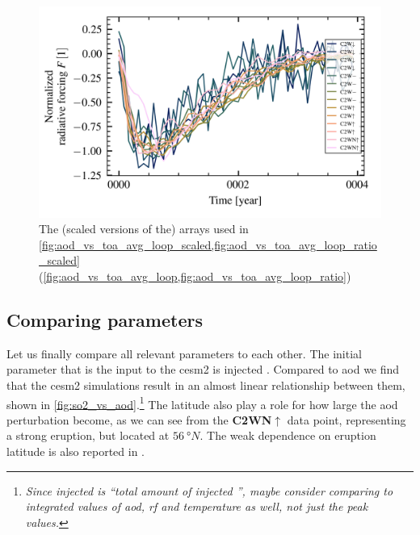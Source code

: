 \documentclass[twocol]{ametsocV5}
\newcommand{\iso}[1][i]{{#1}njected \ce{SO2}}
\begin{document}
\begin{figure}[t]
  \begin{center}
    \includegraphics[width=0.95\linewidth]{figures/toa_arrays_normalized.png}
  \end{center}
  \caption{
    The (scaled versions of the) arrays used in
    \cref{fig:aod_vs_toa_avg_loop_scaled,fig:aod_vs_toa_avg_loop_ratio_scaled}
    (\cref{fig:aod_vs_toa_avg_loop,fig:aod_vs_toa_avg_loop_ratio})
  }%
  \label{fig:toa_arrays_normalized}
\end{figure}

\subsection{Comparing parameters}

Let us finally compare all relevant parameters to each other. The initial parameter that
is the input to the \acrshort{cesm2} is injected . Compared to \acrshort{aod} we
find that the \acrshort{cesm2} simulations result in an almost linear relationship
between them, shown in \cref{fig:so2_vs_aod}.\footnote{\emph{Since \iso{} is ``total
    amount of \iso{}'', maybe consider comparing to integrated values of \acrshort{aod},
    \acrshort{rf} and temperature as well, not just the peak values.}} The latitude also
play a role for how large the \acrshort{aod} perturbation become, as we can see from the
\textbf{C2WN\(\uparrow\)} data point, representing a strong eruption, but located at \(
\SI{56}{\degree N} \). The weak dependence on eruption latitude is also reported in
\citet{marshall2019}.
\end{document}

